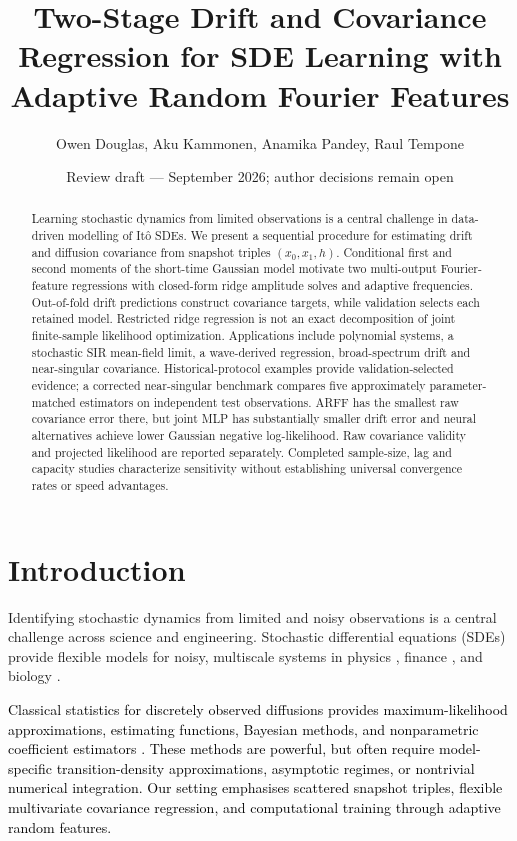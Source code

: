 \documentclass{article}
\title{Two-Stage Drift and Covariance Regression for SDE Learning
with Adaptive Random Fourier Features}
\author{Owen Douglas, Aku Kammonen, Anamika Pandey, Raul Tempone }
\date{Review draft --- September 2026; author decisions remain open}
\begin{document}
\maketitle

\begin{abstract}
Learning stochastic dynamics from limited observations is a central challenge in data-driven modelling of It\^{o} SDEs. We present a sequential procedure for estimating drift and diffusion covariance from snapshot triples $(x_0,x_1,h)$. Conditional first and second moments of the short-time Gaussian model motivate two multi-output Fourier-feature regressions with closed-form ridge amplitude solves and adaptive frequencies. Out-of-fold drift predictions construct covariance targets, while validation selects each retained model. Restricted ridge regression is not an exact decomposition of joint finite-sample likelihood optimization. Applications include polynomial systems, a stochastic SIR mean-field limit, a wave-derived regression, broad-spectrum drift and near-singular covariance. Historical-protocol examples provide validation-selected evidence; a corrected near-singular benchmark compares five approximately parameter-matched estimators on independent test observations. ARFF has the smallest raw covariance error there, but joint MLP has substantially smaller drift error and neural alternatives achieve lower Gaussian negative log-likelihood. Raw covariance validity and projected likelihood are reported separately. Completed sample-size, lag and capacity studies characterize sensitivity without establishing universal convergence rates or speed advantages.

\end{abstract}



\section{Introduction}
Identifying stochastic dynamics from limited and noisy observations is a central challenge across science and engineering. Stochastic differential equations (SDEs) provide flexible models for noisy, multiscale systems in physics \cite{risken1996fokker,vankampen2007stochastic}, finance \cite{Yacine_finance,james2000interest}, and biology \cite{Schwartz_biology}.

\textcolor{black}{Classical statistics for discretely observed diffusions provides maximum-likelihood approximations, estimating functions, Bayesian methods, and nonparametric coefficient estimators \citep{Yacine_finance,Sorensen2009}. These methods are powerful, but often require model-specific transition-density approximations, asymptotic regimes, or nontrivial numerical integration. Our setting emphasises scattered snapshot triples, flexible multivariate covariance regression, and computational training through adaptive random features.}
\end{document}
